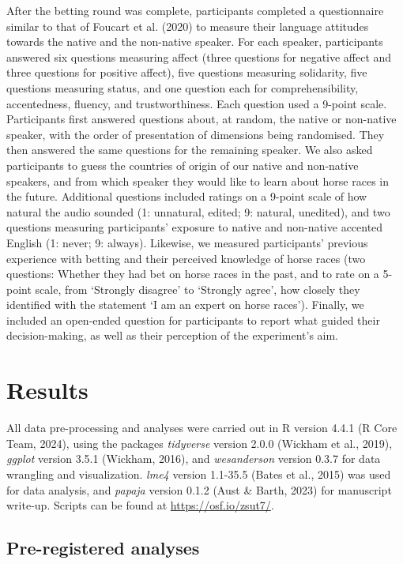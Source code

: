\documentclass[
  man,floatsintext]{apa7}
\begin{document}
After the betting round was complete, participants completed a questionnaire similar to that of Foucart et al. (2020) to measure their language attitudes towards the native and the non-native speaker. For each speaker, participants answered six questions measuring affect (three questions for negative affect and three questions for positive affect), five questions measuring solidarity, five questions measuring status, and one question each for comprehensibility, accentedness, fluency, and trustworthiness. Each question used a 9-point scale. Participants first answered questions about, at random, the native or non-native speaker, with the order of presentation of dimensions being randomised. They then answered the same questions for the remaining speaker. We also asked participants to guess the countries of origin of our native and non-native speakers, and from which speaker they would like to learn about horse races in the future. Additional questions included ratings on a 9-point scale of how natural the audio sounded (1: unnatural, edited; 9: natural, unedited), and two questions measuring participants' exposure to native and non-native accented English (1: never; 9: always). Likewise, we measured participants' previous experience with betting and their perceived knowledge of horse races (two questions: Whether they had bet on horse races in the past, and to rate on a 5-point scale, from `Strongly disagree' to `Strongly agree', how closely they identified with the statement `I am an expert on horse races'). Finally, we included an open-ended question for participants to report what guided their decision-making, as well as their perception of the experiment's aim.

\hypertarget{results}{%
\section{Results}\label{results}}

All data pre-processing and analyses were carried out in R version 4.4.1 (R Core Team, 2024), using the packages \emph{tidyverse} version 2.0.0 (Wickham et al., 2019), \emph{ggplot} version 3.5.1 (Wickham, 2016), and \emph{wesanderson} version 0.3.7 for data wrangling and visualization. \emph{lme4} version 1.1-35.5 (Bates et al., 2015) was used for data analysis, and \emph{papaja} version 0.1.2 (Aust \& Barth, 2023) for manuscript write-up. Scripts can be found at \url{https://osf.io/zsut7/}.

\hypertarget{pre-registered-analyses}{%
\subsection{Pre-registered analyses}\label{pre-registered-analyses}}
\end{document}
